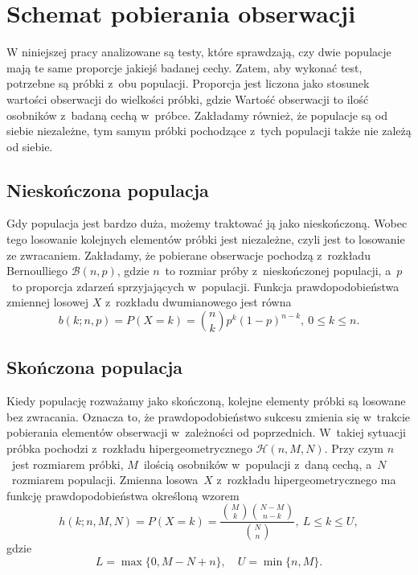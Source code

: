 \chapter{Schemat pobierania obserwacji}

W niniejszej pracy analizowane są testy, które sprawdzają, czy dwie populacje mają te same proporcje jakiejś badanej cechy. Zatem, aby wykonać test, potrzebne są próbki z~obu populacji. Proporcja jest liczona jako stosunek wartości obserwacji do wielkości próbki, gdzie Wartość obserwacji to ilość osobników z~badaną cechą w~próbce. Zakładamy również, że populacje są od siebie niezależne, tym samym próbki pochodzące z~tych populacji także nie zależą od siebie. 


\section{Nieskończona populacja}
Gdy populacja jest bardzo duża, możemy traktować ją jako nieskończoną. Wobec tego losowanie kolejnych elementów próbki jest niezależne, czyli jest to losowanie ze zwracaniem. Zakładamy, że pobierane obserwacje pochodzą z~rozkładu Bernoulliego $\mathcal{B}(n,p)$, gdzie $n$~to rozmiar próby z~nieskończonej populacji, a~$p$~to proporcja zdarzeń sprzyjających w~populacji. Funkcja prawdopodobieństwa zmiennej losowej $X$ z~rozkładu dwumianowego jest równa
\begin{equation}
b(k;n,p) = P(X=k) = \binom{n}{k} p^k (1-p)^{n-k},\ 0\leq k\leq n.
\end{equation}

\section{Skończona populacja}
\label{r1:skonczonapopulacja}
Kiedy populację rozważamy jako skończoną, kolejne elementy próbki są losowane bez zwracania. Oznacza to, że prawdopodobieństwo sukcesu zmienia się w~trakcie pobierania elementów obserwacji w~zależności od poprzednich. W~takiej sytuacji próbka pochodzi z~rozkładu hipergeometrycznego $\mathcal{H}(n,M,N)$. Przy czym $n$~jest rozmiarem próbki, $M$~ilością osobników w~populacji z~daną cechą, a~$N$~rozmiarem populacji. Zmienna losowa~$X$ z~rozkładu hipergeometrycznego ma funkcję prawdopodobieństwa określoną wzorem
\begin{equation}
\label{hg}
h(k;n,M,N) = P(X=k) = \frac{\binom{M}{k} \binom{N-M}{n-k}}{\binom{N}{n}},\ L\leq k\leq U,
\end{equation}
gdzie
\begin{equation}
\label{ograniczenia}
L=\max\{0,M-N+n\},\quad U=\min\{n,M\}.
\end{equation}

